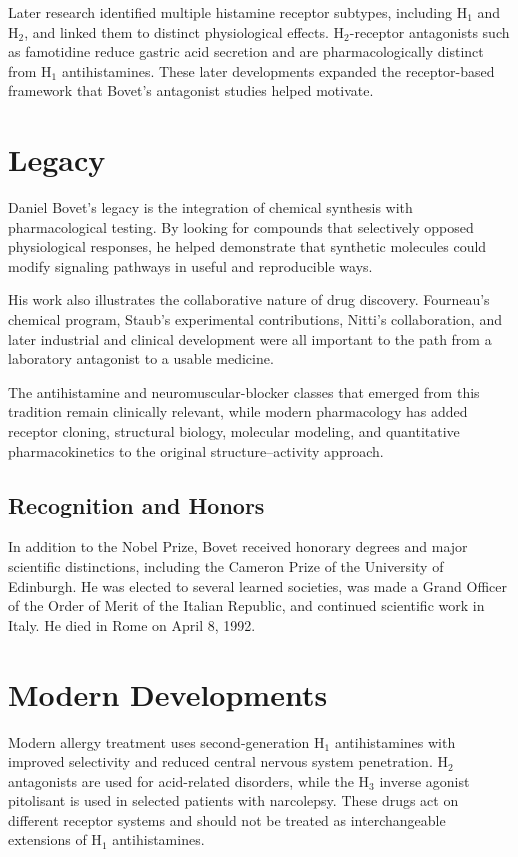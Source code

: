 Later research identified multiple histamine receptor subtypes, including H$_1$ and H$_2$, and linked them to distinct physiological effects. H$_2$-receptor antagonists such as famotidine reduce gastric acid secretion and are pharmacologically distinct from H$_1$ antihistamines. These later developments expanded the receptor-based framework that Bovet's antagonist studies helped motivate.

\section{Legacy}

Daniel Bovet's legacy is the integration of chemical synthesis with pharmacological testing. By looking for compounds that selectively opposed physiological responses, he helped demonstrate that synthetic molecules could modify signaling pathways in useful and reproducible ways.

His work also illustrates the collaborative nature of drug discovery. Fourneau's chemical program, Staub's experimental contributions, Nitti's collaboration, and later industrial and clinical development were all important to the path from a laboratory antagonist to a usable medicine.

The antihistamine and neuromuscular-blocker classes that emerged from this tradition remain clinically relevant, while modern pharmacology has added receptor cloning, structural biology, molecular modeling, and quantitative pharmacokinetics to the original structure--activity approach.

\subsection{Recognition and Honors}

In addition to the Nobel Prize, Bovet received honorary degrees and major scientific distinctions, including the Cameron Prize of the University of Edinburgh. He was elected to several learned societies, was made a Grand Officer of the Order of Merit of the Italian Republic, and continued scientific work in Italy. He died in Rome on April 8, 1992.

\section{Modern Developments}

Modern allergy treatment uses second-generation H$_1$ antihistamines with improved selectivity and reduced central nervous system penetration. H$_2$ antagonists are used for acid-related disorders, while the H$_3$ inverse agonist pitolisant is used in selected patients with narcolepsy. These drugs act on different receptor systems and should not be treated as interchangeable extensions of H$_1$ antihistamines.

